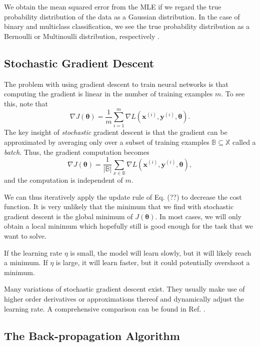 We obtain the mean squared error from the MLE if we regard the true probability distribution of the data as a Gaussian distribution. In the case of binary and multiclass classification, we see the true probability distribution as a Bernoulli or Multinoulli distribution, respectively \cite[ Ch.\,6,\,pp.\,175-185]{DBLP:books/daglib/0040158}.

\subsection{Stochastic Gradient Descent}
The problem with using gradient descent to train neural networks is that computing the gradient is linear in the number of training examples $m$. To see this, note that
\begin{equation}
\nabla J(\bm{\theta}) = \frac1{m}\sum_{i=1}^{m}\nabla L(\bm{x}^{(i)},\bm{y}^{(i)},\bm{\theta}).
\end{equation}
The key insight of \emph{stochastic} gradient descent is that the gradient can be approximated by averaging only over a subset of training examples $\mathbb{B} \subseteq \mathbb{X}$ called a \emph{batch}. Thus, the gradient computation becomes
\begin{equation}
\nabla J(\bm{\theta}) = \frac1{|\mathbb{B}|}\sum_{x\in\mathbb{B}}\nabla L(\bm{x}^{(i)},\bm{y}^{(i)},\bm{\theta}),
\end{equation}
and the computation is independent of $m$.

We can thus iteratively apply the update rule of Eq. (??) to decrease the cost function. It is very unlikely that the minimum that we find with stochastic gradient descent is the global minimum of $J(\bm{\theta})$. In most cases, we will only obtain a local minimum which hopefully still is good enough for the task that we want to solve.

If the learning rate $\eta$ is small, the model will learn slowly, but it will likely reach a minimum. If $\eta$ is large, it will learn faster, but it could potentially overshoot a minimum.

Many variations of stochastic gradient descent exist. They usually make use of higher order derivatives or approximations thereof and dynamically adjust the learning rate. A comprehensive comparison can be found in Ref. .

\subsection{The Back-propagation Algorithm}
